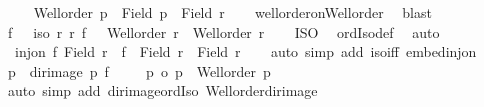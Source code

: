 \begin{isabellebody}
\ \ \isamarkupfalse%
\ {}{\isacharcolon}{\kern0pt}\ {\isachardoublequoteopen}Well{\isacharunderscore}{\kern0pt}order\ p{\isacharprime}{\kern0pt}\ {\isasymand}\ Field\ p{\isacharprime}{\kern0pt}\ {\isacharequal}{\kern0pt}\ Field\ r{\isacharprime}{\kern0pt}{\isachardoublequoteclose}\isanewline
\ \ \isamarkupfalse%
\ well{\isacharunderscore}{\kern0pt}order{\isacharunderscore}{\kern0pt}on{\isacharunderscore}{\kern0pt}Well{\isacharunderscore}{\kern0pt}order\ \isamarkupfalse%
\ blast\isanewline
\ \ \isamarkupfalse%
\ f\ \ {}{\isacharcolon}{\kern0pt}\ {\isachardoublequoteopen}iso\ r{\isacharprime}{\kern0pt}\ r\ f{\isachardoublequoteclose}\ \ {}{\isacharcolon}{\kern0pt}\ {\isachardoublequoteopen}Well{\isacharunderscore}{\kern0pt}order\ r\ {\isasymand}\ Well{\isacharunderscore}{\kern0pt}order\ r{\isacharprime}{\kern0pt}{\isachardoublequoteclose}\isanewline
\ \ \isamarkupfalse%
\ ISO\ \isamarkupfalse%
\ ordIso{\isacharunderscore}{\kern0pt}def\ \isamarkupfalse%
\ auto\isanewline
\ \ \isamarkupfalse%
\ {}{\isacharcolon}{\kern0pt}\ {\isachardoublequoteopen}inj{\isacharunderscore}{\kern0pt}on\ f\ {\isacharparenleft}{\kern0pt}Field\ r{\isacharprime}{\kern0pt}{\isacharparenright}{\kern0pt}\ {\isasymand}\ f\ {\isacharbackquote}{\kern0pt}\ {\isacharparenleft}{\kern0pt}Field\ r{\isacharprime}{\kern0pt}{\isacharparenright}{\kern0pt}\ {\isacharequal}{\kern0pt}\ Field\ r{\isachardoublequoteclose}\isanewline
\ \ \isamarkupfalse%
\ {\isacharparenleft}{\kern0pt}auto\ simp\ add{\isacharcolon}{\kern0pt}\ iso{\isacharunderscore}{\kern0pt}iff\ embed{\isacharunderscore}{\kern0pt}inj{\isacharunderscore}{\kern0pt}on{\isacharparenright}{\kern0pt}\isanewline
\ \ \isamarkupfalse%
\ {\isacharquery}{\kern0pt}p\ {\isacharequal}{\kern0pt}\ {\isachardoublequoteopen}dir{\isacharunderscore}{\kern0pt}image\ p{\isacharprime}{\kern0pt}\ f{\isachardoublequoteclose}\isanewline
\ \ \isamarkupfalse%
\ {}{\isacharcolon}{\kern0pt}\ {\isachardoublequoteopen}p{\isacharprime}{\kern0pt}\ {\isacharequal}{\kern0pt}o\ {\isacharquery}{\kern0pt}p\ {\isasymand}\ Well{\isacharunderscore}{\kern0pt}order\ {\isacharquery}{\kern0pt}p{\isachardoublequoteclose}\isanewline
\ \ \isamarkupfalse%
\ {}\ {}\ {}\ \isamarkupfalse%
\ {\isacharparenleft}{\kern0pt}auto\ simp\ add{\isacharcolon}{\kern0pt}\ dir{\isacharunderscore}{\kern0pt}image{\isacharunderscore}{\kern0pt}ordIso\ Well{\isacharunderscore}{\kern0pt}order{\isacharunderscore}{\kern0pt}dir{\isacharunderscore}{\kern0pt}image{\isacharparenright}{\kern0pt}\isanewline

\end{isabellebody}
